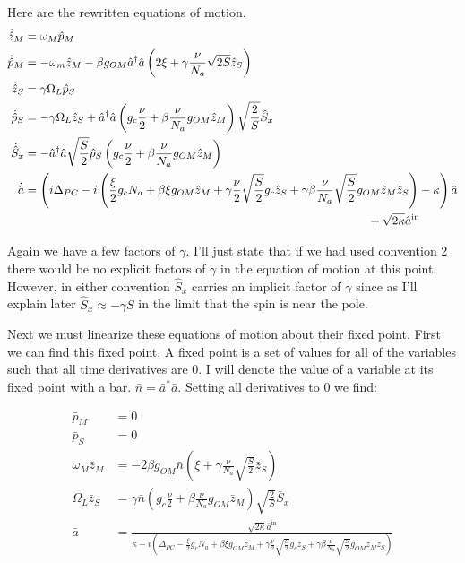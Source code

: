 \documentclass[12pt]{article}
\begin{document}
Here are the rewritten equations of motion.
\begin{align*}
\dot{\hat{z}}_M &= \omega_M \hat{p}_M \\
\dot{\hat{p}}_M &= -\omega_m \hat{z}_M - \beta g_{OM} \hat{a}^{\dag}\hat{a} \left( 2\xi + \gamma \frac{\nu}{N_a} \sqrt{2S} \hat{z}_S \right) \\
\dot{\hat{z}}_S &= \gamma \Omega_L \hat{p}_S \\
\dot{\hat{p}}_S &= -\gamma \Omega_L \hat{z}_S + \hat{a}^{\dag} \hat{a} \left( g_c \frac{\nu}{2} + \beta \frac{\nu}{N_a} g_{OM} \hat{z}_M \right) \sqrt{\frac{2}{S}} \hat{S}_x \\
\dot{\hat{S}}_x &= -\hat{a}^{\dag}\hat{a} \sqrt{\frac{S}{2}} \hat{p}_S\left( g_c \frac{\nu}{2} + \beta \frac{\nu}{N_a} g_{OM} \hat{z}_M \right) \\
\dot{\hat{a}} &= \left( i \Delta_{PC} - i \left(\frac{\xi}{2} g_c N_a + \beta \xi g_{OM} \hat{z}_M + \gamma \frac{\nu}{2} \sqrt{\frac{S}{2}} g_c \hat{z}_S + \gamma \beta \frac{\nu}{N_a} \sqrt{\frac{S}{2}} g_{OM} \hat{z}_M \hat{z}_S \right) - \kappa   \right)\hat{a} \\
& \hspace{4 in} + \sqrt{2 \kappa} \hat{a}^{\text{in}}
\end{align*}

Again we have a few factors of $\gamma$. I'll just state that if we had used convention 2 there would be no explicit factors of $\gamma$ in the equation of motion at this point. However, in either convention $\hat{S}_x$ carries an implicit factor of $\gamma$ since as I'll explain later $\hat{S}_x \approx -\gamma S$ in the limit that the spin is near the pole.

Next we must linearize these equations of motion about their fixed point. First we can find this fixed point. A fixed point is a set of values for all of the variables such that all time derivatives are 0. I will denote the value of a variable at its fixed point with a bar. $\bar{n} = \bar{a}^* \bar{a}$. Setting all derivatives to 0 we find:

\begin{align}
\bar{p}_M &= 0 \\
\bar{p}_S &= 0 \\
\omega_M \bar{z}_M &= -2\beta g_{OM} \bar{n} \left( \xi + \gamma \frac{\nu}{N_a} \sqrt{\frac{S}{2}} \bar{z}_S \right) \\
\Omega_L \bar{z}_S &= \gamma \bar{n} \left( g_c \frac{\nu}{2} + \beta \frac{\nu}{N_a} g_{OM} \bar{z}_M \right) \sqrt{\frac{2}{S}} \bar{S}_x \\
\bar{a} &= \frac{\sqrt{2 \kappa} \bar{a}^{\text{in}}}{\kappa - i\left( \Delta_{PC} - \frac{\xi}{2} g_c N_a + \beta \xi g_{OM} \bar{z}_M + \gamma \frac{\nu}{2} \sqrt{\frac{S}{2}} g_c \bar{z}_S + \gamma \beta \frac{\nu}{N_a} \sqrt{\frac{S}{2}} g_{OM} \bar{z}_M \bar{z}_S\right)}
\end{align}
\end{document}

